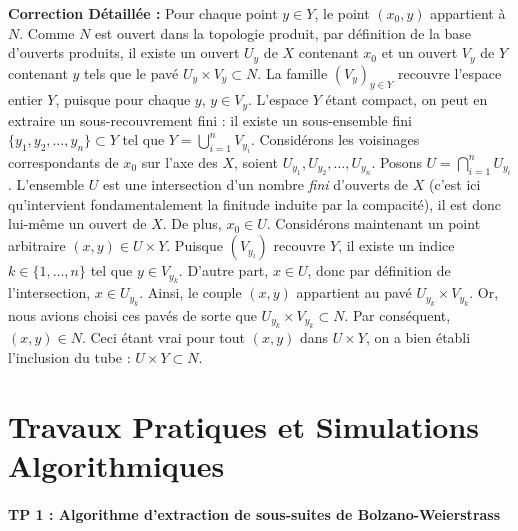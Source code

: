 \documentclass[11pt,a4paper]{article}
\begin{document}
\textbf{Correction Détaillée :}
Pour chaque point $y \in Y$, le point $(x_0, y)$ appartient à $N$.
Comme $N$ est ouvert dans la topologie produit, par définition de la base d'ouverts produits, il existe un ouvert $U_y$ de $X$ contenant $x_0$ et un ouvert $V_y$ de $Y$ contenant $y$ tels que le pavé $U_y \times V_y \subset N$.
La famille $(V_y)_{y \in Y}$ recouvre l'espace entier $Y$, puisque pour chaque $y$, $y \in V_y$.
L'espace $Y$ étant compact, on peut en extraire un sous-recouvrement fini : il existe un sous-ensemble fini $\{y_1, y_2, \dots, y_n\} \subset Y$ tel que $Y = \bigcup_{i=1}^n V_{y_i}$.
Considérons les voisinages correspondants de $x_0$ sur l'axe des $X$, soient $U_{y_1}, U_{y_2}, \dots, U_{y_n}$.
Posons $U = \bigcap_{i=1}^n U_{y_i}$.
L'ensemble $U$ est une intersection d'un nombre \textit{fini} d'ouverts de $X$ (c'est ici qu'intervient fondamentalement la finitude induite par la compacité), il est donc lui-même un ouvert de $X$. De plus, $x_0 \in U$.
Considérons maintenant un point arbitraire $(x, y) \in U \times Y$.
Puisque $(V_{y_i})$ recouvre $Y$, il existe un indice $k \in \{1, \dots, n\}$ tel que $y \in V_{y_k}$.
D'autre part, $x \in U$, donc par définition de l'intersection, $x \in U_{y_k}$.
Ainsi, le couple $(x, y)$ appartient au pavé $U_{y_k} \times V_{y_k}$.
Or, nous avions choisi ces pavés de sorte que $U_{y_k} \times V_{y_k} \subset N$.
Par conséquent, $(x, y) \in N$.
Ceci étant vrai pour tout $(x, y)$ dans $U \times Y$, on a bien établi l'inclusion du tube : $U \times Y \subset N$.



\part{Travaux Pratiques et Simulations Algorithmiques}
\subsection*{TP 1 : Algorithme d'extraction de sous-suites de Bolzano-Weierstrass}
\end{document}
